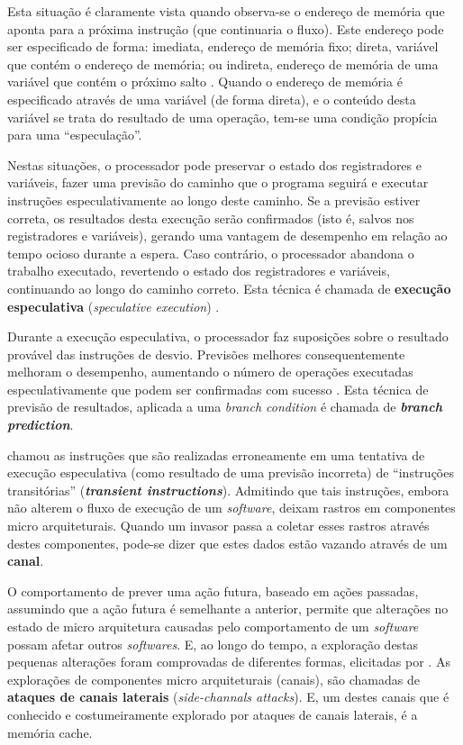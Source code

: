 \documentclass[
	article,			    %
	12pt,				    %
	oneside,			    %
	a4paper,			    %
	chapter=TITLE,		    %
	section=TITLE,		    %
	subsection=TITLE,	    %
	english,			    %
	brazil,				    %
	sumario=tradicional
]{abntex2}
\begin{document}
Esta situação é claramente vista quando observa-se o endereço de memória que aponta para a próxima instrução (que continuaria o fluxo). Este endereço pode ser especificado de forma: imediata, endereço de memória fixo; direta, variável que contém o endereço de memória; ou indireta, endereço de memória de uma variável que contém o próximo salto \cite{Debarshi2018Addressing}. Quando o endereço de memória é especificado através de uma variável (de forma direta), e o conteúdo desta variável se trata do resultado de uma operação, tem-se uma condição propícia para uma ``especulação''.

Nestas situações, o processador pode preservar o estado dos registradores e variáveis, fazer uma previsão do caminho que o programa seguirá e executar instruções especulativamente ao longo deste caminho. Se a previsão estiver correta, os resultados desta execução serão confirmados (isto é, salvos nos registradores e variáveis), gerando uma vantagem de desempenho em relação ao tempo ocioso durante a espera. Caso contrário, o processador abandona o trabalho executado, revertendo o estado dos registradores e variáveis, continuando ao longo do caminho correto. Esta técnica é chamada de \textbf{execução especulativa} (\emph{speculative execution}) \cite{Kocher2018Spectre}.

Durante a execução especulativa, o processador faz suposições sobre o resultado provável das instruções de desvio. Previsões melhores consequentemente melhoram o desempenho, aumentando o número de operações executadas especulativamente que podem ser confirmadas com sucesso \cite{Kocher2018Spectre}. Esta técnica de previsão de resultados, aplicada a uma \emph{branch condition} é chamada de \textbf{\emph{branch prediction}}.

 chamou as instruções que são realizadas erroneamente em uma tentativa de execução especulativa (como resultado de uma previsão incorreta) de ``instruções transitórias'' (\textbf{\emph{transient instructions}}). Admitindo que tais instruções, embora não alterem o fluxo de execução de um \emph{software}, deixam rastros em componentes micro arquiteturais. Quando um invasor passa a coletar esses rastros através destes componentes, pode-se dizer que estes dados estão vazando através de um \textbf{canal}.

O comportamento de prever uma ação futura, baseado em ações passadas, assumindo que a ação futura é semelhante a anterior, permite que alterações no estado de micro arquitetura causadas pelo comportamento de um \emph{software} possam afetar outros \emph{softwares}. E, ao longo do tempo, a exploração destas pequenas alterações foram comprovadas de diferentes formas, elicitadas por . As explorações de componentes micro arquiteturais (canais), são chamadas de \textbf{ataques de canais laterais} (\emph{side-channals attacks}). E, um destes canais que é conhecido e costumeiramente explorado por ataques de canais laterais, é a memória cache.
\end{document}
